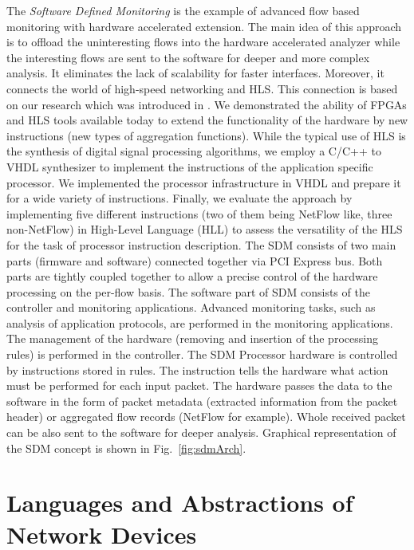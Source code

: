 The \textit{Software Defined Monitoring} \cite{KekelyPusKorenekSDM} is the example of advanced flow based monitoring with hardware accelerated extension.
The main idea of this approach is to offload the uninteresting flows into the hardware accelerated analyzer while the 
interesting flows are sent to the software for deeper and more complex analysis. It eliminates the lack of scalability for faster interfaces. 
Moreover, it connects the world of high-speed networking and HLS. 
This connection is based on our research which was introduced in \cite{PusBenacekSDMUpdate}.
We demonstrated the ability of FPGAs and HLS tools available today to extend the 
functionality of the hardware by new instructions (new types of aggregation functions).
While the typical use of HLS is the synthesis of digital signal processing algorithms,
we employ a C/C++ to VHDL synthesizer to implement the instructions of the application specific processor.
We implemented the processor infrastructure in VHDL and prepare it for a wide variety of instructions.
Finally, we evaluate the approach by implementing five different instructions (two of them being NetFlow like, three non-NetFlow) in 
High-Level Language (HLL) to assess the versatility of the HLS for the task of processor instruction description.
The SDM consists of two main parts (firmware and software) connected together via PCI Express bus. 
Both parts are tightly coupled together to allow a precise control of the hardware processing on the per-flow basis.
The software part of SDM consists of the controller and monitoring applications. 
Advanced monitoring tasks, such as analysis of application protocols, are performed in the monitoring applications.
The management of the hardware (removing and insertion of the processing rules) is performed in the controller.
The SDM Processor hardware is controlled by instructions stored in rules.
The instruction tells the hardware what action must be performed for each input packet.
The hardware passes the data to the software in the form of packet metadata (extracted information from the packet header) or aggregated 
flow records (NetFlow for example).
Whole received packet can be also sent to the software for deeper analysis. Graphical representation of the SDM concept is shown 
in Fig.~\ref{fig:sdmArch}.


\section{Languages and Abstractions of Network Devices}

